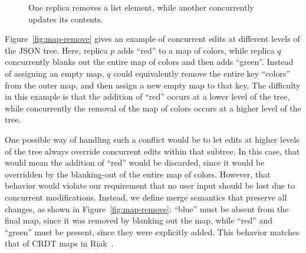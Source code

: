 \documentclass[10pt,journal,compsoc]{IEEEtran}
\begin{document}
\begin{figure}[p]
\centering
{}
\caption{One replica removes a list element, while another concurrently updates its contents.}\label{fig:todo-item}
\end{figure}

Figure~\ref{fig:map-remove} gives an example of concurrent edits at different levels of the JSON tree. Here, replica $p$ adds ``red'' to a map of colors, while replica $q$ concurrently blanks out the entire map of colors and then adds ``green''. Instead of assigning an empty map, $q$ could equivalently remove the entire key ``colors'' from the outer map, and then assign a new empty map to that key. The difficulty in this example is that the addition of ``red'' occurs at a lower level of the tree, while concurrently the removal of the map of colors occurs at a higher level of the tree.

One possible way of handling such a conflict would be to let edits at higher levels of the tree always override concurrent edits within that subtree. In this case, that would mean the addition of ``red'' would be discarded, since it would be overridden by the blanking-out of the entire map of colors. However, that behavior would violate our requirement that no user input should be lost due to concurrent modifications. Instead, we define merge semantics that preserve all changes, as shown in Figure~\ref{fig:map-remove}: ``blue'' must be absent from the final map, since it was removed by blanking out the map, while ``red'' and ``green'' must be present, since they were explicitly added. This behavior matches that of CRDT maps in Riak~\cite{Brown:2014hs,Brown:2013wy}.
\end{document}
